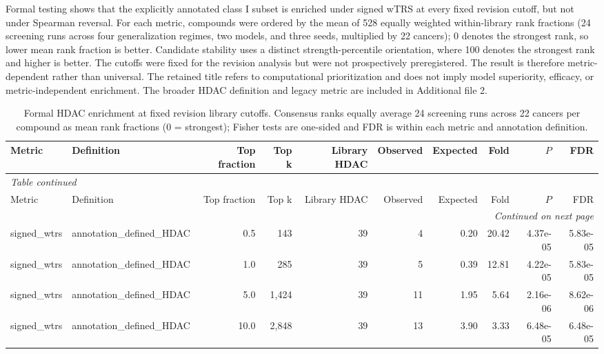 \begin{landscape}
\begingroup
\small
Formal testing shows that the explicitly annotated class I subset is enriched under signed wTRS at every fixed revision cutoff, but not under Spearman reversal. For each metric, compounds were ordered by the mean of 528 equally weighted within-library rank fractions (24 screening runs across four generalization regimes, two models, and three seeds, multiplied by 22 cancers); 0 denotes the strongest rank, so lower mean rank fraction is better. Candidate stability uses a distinct strength-percentile orientation, where 100 denotes the strongest rank and higher is better. The cutoffs were fixed for the revision analysis but were not prospectively preregistered. The result is therefore metric-dependent rather than universal. The retained title refers to computational prioritization and does not imply model superiority, efficacy, or metric-independent enrichment. The broader HDAC definition and legacy metric are included in Additional file 2.
\par\vspace{0.5em}
\scriptsize
\begin{longtable}{@{}llrrrrrrrr@{}}
\caption{Formal HDAC enrichment at fixed revision library cutoffs. Consensus ranks equally average 24 screening runs across 22 cancers per compound as mean rank fractions (0 = strongest); Fisher tests are one-sided and FDR is within each metric and annotation definition.}\label{tab:s_enrichment}\\
\toprule
Metric & Definition & Top fraction & Top k & Library HDAC & Observed & Expected & Fold & $P$ & FDR \\
\midrule
\endfirsthead
\multicolumn{10}{l}{\textit{Table continued}}\\
\toprule
Metric & Definition & Top fraction & Top k & Library HDAC & Observed & Expected & Fold & $P$ & FDR \\
\midrule
\endhead
\midrule
\multicolumn{10}{r}{\textit{Continued on next page}}\\
\endfoot
\bottomrule
\endlastfoot
signed\_wtrs & annotation\_defined\_HDAC & 0.5 & 143 & 39 & 4 & 0.20 & 20.42 & 4.37e-05 & 5.83e-05 \\
signed\_wtrs & annotation\_defined\_HDAC & 1.0 & 285 & 39 & 5 & 0.39 & 12.81 & 4.22e-05 & 5.83e-05 \\
signed\_wtrs & annotation\_defined\_HDAC & 5.0 & 1,424 & 39 & 11 & 1.95 & 5.64 & 2.16e-06 & 8.62e-06 \\
signed\_wtrs & annotation\_defined\_HDAC & 10.0 & 2,848 & 39 & 13 & 3.90 & 3.33 & 6.48e-05 & 6.48e-05 \\

\end{longtable}
\end{landscape}
